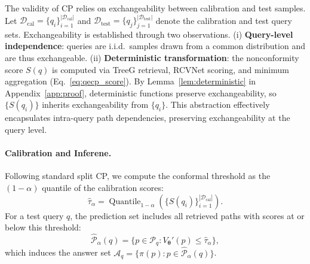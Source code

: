 \documentclass{article}
\theoremstyle{plain}
\theoremstyle{definition}
\theoremstyle{remark}
\begin{document}

The validity of CP relies on exchangeability between 
calibration and test samples. Let  $\mathcal{D}_{\text{cal}} = \{q_i\}_{i=1}^{\vert\mathcal{D}_{\text{cal}}\vert}$ 
and $\mathcal{D}_{\text{test}} = \{q_j\}_{j=1}^{\vert\mathcal{D}_{\text{test}}\vert}$ denote the 
calibration and test query sets. Exchangeability is established through two observations. 
(i) \textbf{Query-level independence}: queries are i.i.d.\ samples drawn from 
a common distribution and are thus exchangeable. (ii) 
\textbf{Deterministic transformation}: the nonconformity score $S(q)$ is computed 
via TreeG retrieval, RCVNet scoring, and minimum aggregation (Eq.~\ref{eq:qecp_score}). 
By Lemma~\ref{lem:deterministic} in Appendix~\ref{app:proof}, deterministic 
functions preserve exchangeability, so $\{S(q_i)\}$ inherits exchangeability 
from $\{q_i\}$. This abstraction effectively encapsulates intra-query path 
dependencies, preserving exchangeability at the query level.

\paragraph{Calibration and Inferene.}
Following standard split CP, we compute the conformal threshold as the $(1-\alpha)$ quantile of the calibration scores:
\begin{equation}
    \hat{\tau}_\alpha = \operatorname{Quantile}_{1-\alpha}\left(\{S(q_i)\}_{i=1}^{|\mathcal{D}_{\text{cal}}|}\right).
    \label{eq:quantile}
\end{equation}
For a test query $q$, the prediction set includes all retrieved paths with scores at or below this threshold:
\begin{equation}
    \widehat{\mathcal{P}}_\alpha(q) = \{p \in \mathcal{P}_q : V_{\bm\theta}'(p) \le \hat{\tau}_\alpha\},
\end{equation}
which induces the answer set $\mathcal{A}_q = \{\pi(p) : p \in \widehat{\mathcal{P}}_\alpha(q)\}$.
\end{document}
